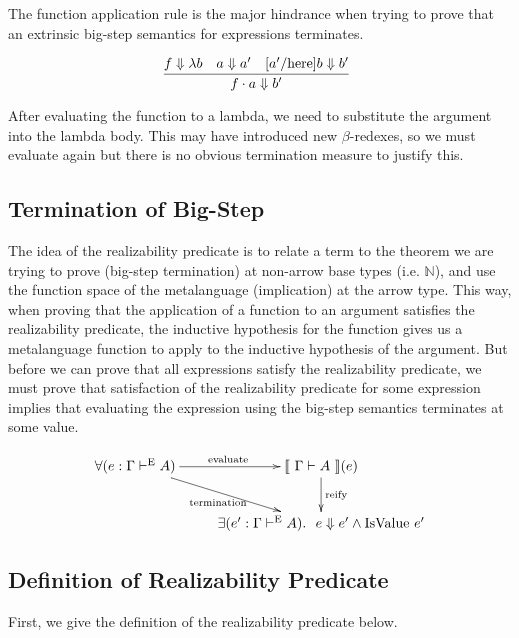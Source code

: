 \documentclass[preprint,nonatbib]{sigplanconf}
\numberwithin{subdefin}{defin}
\theoremstyle{definition}
\numberwithin{subtheorem}{theorem}
\numberwithin{sublemma}{theorem}
\numberwithin{corollary}{theorem}
\numberwithin{case}{theorem}
\numberwithin{slcase}{sublemma}
\numberwithin{scase}{subtheorem}
\numberwithin{lcase}{lemma}
\def\bigstep{\Downarrow}
\def\app{\cdot}
\def\lam{\lambda}
\def\nat{\mathbb{N}}
\newcommand{\turn}[1]{\vdash^\con{#1}}
\newcommand{\ascribe}[2]{(#1 : #2)}
\newcommand{\ex}[1]{\exists#1.~}
\newcommand{\el}[1]{\llbracket ~ #1 ~ \rrbracket}
\newcommand{\con}[1]{\textmd{#1}}
\newcommand{\fun}[1]{\textmd{#1}}
\newcommand{\typm}[1]{\el{\Gamma \vdash #1}}
\newcommand{\type}[1]{\Gamma \turn{E} #1}
\begin{document}
The function application rule is the major hindrance when trying
to prove that an extrinsic big-step semantics for expressions
terminates. 

$$
\infer
  []{f \app a \bigstep {b'}}
{
  f \bigstep \lam b
  &
  a \bigstep a'
  &
  [a'/\con{here}]b \bigstep b'
}
$$

After evaluating the function to a lambda, we need to
substitute the argument into the lambda body. This may have introduced
new $\beta$-redexes, so we must evaluate again but
there is no obvious termination measure to justify this.

\subsection{Termination of Big-Step}

The idea of the realizability predicate is to relate a term to the
theorem we are trying to prove (big-step termination) at non-arrow
base types (i.e. $\nat$), and use the function space of the
metalanguage (implication) at the arrow type. This way, when proving
that the application of a function to an argument satisfies the
realizability predicate, the inductive hypothesis for the function
gives us a metalanguage function to apply to the inductive hypothesis
of the argument. But before we can prove that all expressions satisfy
the realizability predicate, we must prove that satisfaction of the
realizability predicate for some expression implies that evaluating
the expression using the big-step semantics terminates at some value.

\begin{displaymath}
    \xymatrix{
          {\forall \ascribe{e}{\type{A}}} 
          \ar[dr]_{\fun{termination}}
          \ar[r]^{\fun{evaluate}}
        & {\typm{A}(e)}
          \ar[d]^{\large{\fun{reify}}}
\\      & {\ex{\ascribe{e'}{\type{A}}} ~ e \bigstep e' \wedge \fun{IsValue} ~ e'} }
\end{displaymath}

\subsection{Definition of Realizability Predicate}

First, we give the definition of the realizability predicate below.
\end{document}
